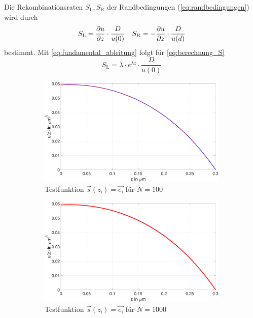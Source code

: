 Die Rekombinationsraten $S_\mathrm{L},S_\mathrm{R}$ der Randbedingungen
(\cref{eq:randbedingungen}) wird durch
\begin{equation}\label{eq:berechnung_S}
	S_\mathrm{L}=\pdv{u}{z}\cdot\frac{D}{u(0)} \quad
	S_\mathrm{R}=-\pdv{u}{z}\cdot \frac{D}{u(d)}
\end{equation}
bestimmt.
Mit \cref{eq:fundamental_ableitung} folgt für \cref{eq:berechnung_S}
\begin{equation}
	S_\mathrm{L}=\lambda \cdot e^{\lambda z}\cdot\frac{D}{u(0)}
\end{equation} 
\begin{figure}
	\begin{subfigure}[b]{.5\textwidth}

		\includegraphics[width=1\linewidth]{figures/station_gl_2_1/aufgabe_7_test_100}
		\caption{Testfunktion
			$\vec{s}(z_\mathrm{i})=\vec{e_\mathrm{i}}$ für $N=100$}
		\label{fig:aufgabe7test}
	\end{subfigure}
	\begin{subfigure}[b]{.5\textwidth}
		\centering

		\includegraphics[width=1\linewidth]{figures/station_gl_2_1/aufgabe_7_test_n1000}
		\caption{Testfunktion
			$\vec{s}(z_\mathrm{i})=\vec{e_\mathrm{i}}$ für $N=1000$}
	\end{subfigure}
	\newline
	\begin{subfigure}[b]{.5\textwidth}
		\centering


\end{subfigure}
\end{figure}
